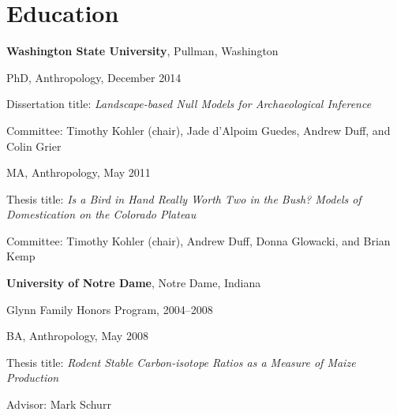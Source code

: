 \section{Education}

{\bf Washington State University}, Pullman, Washington
\begin{list1}
\item[] PhD, Anthropology, December 2014
\begin{list2}
\item[] Dissertation title:  \emph{Landscape-based Null Models for Archaeological Inference}%
\item[] Committee:  Timothy Kohler (chair), Jade d'Alpoim Guedes, Andrew Duff, and Colin Grier
\end{list2}

\vspace{.1in}

\item[] MA, Anthropology, May 2011
\begin{list2}
\item[] Thesis title:  \emph{Is a Bird in Hand Really Worth Two in the
    Bush? Models of Domestication on the Colorado Plateau}%
\item[] Committee:  Timothy Kohler (chair), Andrew Duff, Donna Glowacki, and Brian Kemp
\end{list2}
\end{list1}


{\bf University of Notre Dame}, Notre Dame, Indiana
\begin{list1}
\item[] Glynn Family Honors Program, 2004–2008
\item[] BA, Anthropology, May 2008
\begin{list2}
\item[] Thesis title:  \emph{Rodent Stable Carbon-isotope Ratios as a Measure of Maize Production}
\item[] Advisor:  Mark Schurr
\end{list2}
\end{list1}